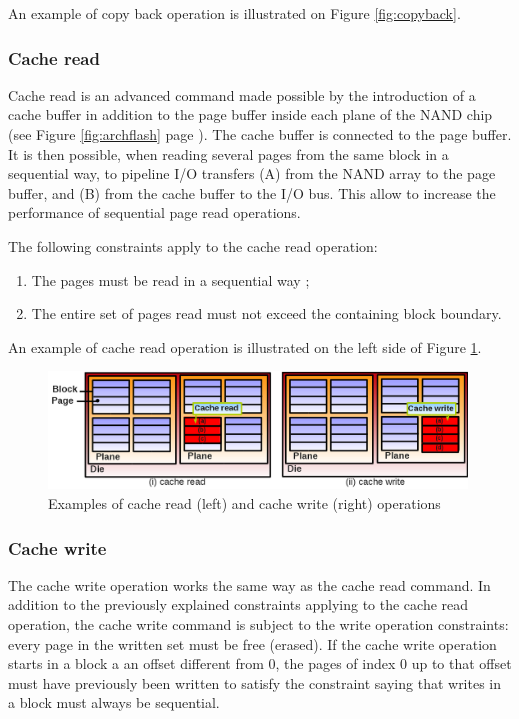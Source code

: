An example of copy back operation is illustrated on Figure \ref{fig:copyback}.

\subsubsection{Cache read}
Cache read is an advanced command made possible by the introduction of a cache buffer in addition to the page buffer inside each plane of the NAND chip (see Figure \ref{fig:archflash} page \pageref{fig:archflash}). The cache buffer is connected to the page buffer. It is then possible, when reading several pages from the same block in a sequential way, to pipeline I/O transfers (A) from the NAND array to the page buffer, and (B) from the cache buffer to the I/O bus. This allow to increase the performance of sequential page read operations.

The following constraints apply to the cache read operation:

\begin{enumerate}
  \item The pages must be read in a sequential way ;
  \item The entire set of pages read must not exceed the containing block boundary.
\end{enumerate}

An example of cache read operation is illustrated on the left side of Figure \ref{fig:cacheop}.

\begin{figure}
  \center
  \includegraphics[width=0.99\textwidth]{Includes/CacheOp.png}
  \caption{Examples of cache read (left) and cache write (right) operations}
  \label{fig:cacheop}
\end{figure}

\subsubsection{Cache write}
The cache write operation works the same way as the cache read command. In addition to the previously explained constraints applying to the cache read operation, the cache write command is subject to the write operation constraints: every page in the written set must be free (erased). If the cache write operation starts in a block a an offset different from 0, the pages of index 0 up to that offset must have previously been written to satisfy the constraint saying that writes in a block must always be sequential.

